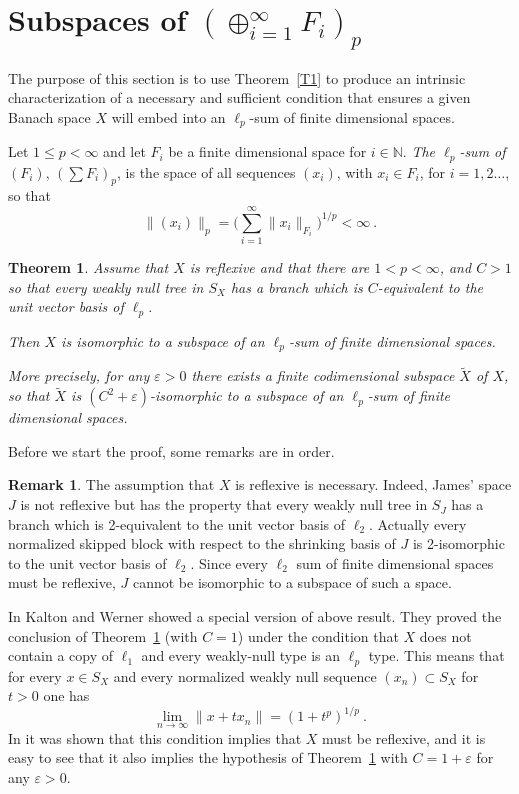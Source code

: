 \documentclass[11pt,leqno]{amsart}
\newtheorem{thm}{Theorem}[section]
\theoremstyle{definition}
\newtheorem*{remark}{Remark}
\newcommand{\vp}{\varepsilon}
\newcommand{\N}{\mathbb{N}}
\begin{document}
\section{Subspaces of $(\oplus_{i=1}^\infty F_i)_p$}\label{S3}

The purpose of this section is to use Theorem~\ref{T1} to produce an
intrinsic characterization of a necessary and sufficient 
condition that ensures a given Banach space
$X$ will embed into an $\ell_p$-sum of finite dimensional spaces.

Let $1\le p<\infty$ and let $F_i$  be a finite dimensional space for $i\in\N$.
{\em The $\ell_p$-sum of} $(F_i)$, $(\sum F_i)_p$, 
is the space  of all sequences
$(x_i)$, with $x_i\in F_i$, for $i=1,2\ldots$, so that
$$\|(x_i)\|_p=\biggl(\sum_{i=1}^\infty \|x_i\|_{F_i}\biggr)^{1/p}<\infty\ .$$

\begin{thm}\label{T2}  
Assume that $X$ is reflexive and that there are $1<p<\infty$,
and $C>1$ so that every weakly null tree in $S_X$ has a branch which
is $C$-equivalent to the  unit vector basis of $\ell_p$.

Then $X$ is isomorphic to a subspace of an $\ell_p$-sum of 
finite dimensional spaces.

More precisely, for any $\vp>0$ there exists a finite codimensional  subspace
$\tilde X$ of $X$, so that $\tilde X$ is $(C^2+\vp)$-isomorphic to
a subspace of an $\ell_p$-sum of finite dimensional spaces.
\end{thm}

Before we start the proof, some remarks are in order.

\begin{remark} 
The assumption that $X$ is reflexive is necessary. 
Indeed, James' space  $J$ \cite{Ja1} is not reflexive but  has 
the property that every weakly null
tree in $S_J$ has a branch which is 2-equivalent to the
unit vector basis of $\ell_2$. 
Actually every normalized skipped block with respect
to the shrinking basis of $J$ is 2-isomorphic to the unit vector basis
of $\ell_2$. 
Since every $\ell_2$ sum  of finite dimensional spaces
must be reflexive, $J$ cannot be isomorphic to a subspace of such a space.
\end{remark}
 
In \cite{KW} Kalton and Werner showed a special version of above result. 
They proved  the conclusion of Theorem~\ref{T2} (with $C=1$) 
under the condition that  $X$ does not contain a copy of $\ell_1$ and
every weakly-null type is an $\ell_p$ type.
This means that for every $x\in S_X$ and
every normalized weakly null sequence $(x_n)\subset S_X$ for $t>0$ one has  
\begin{equation}\label{E24}
\lim_{n\to\infty}\|x+tx_n\|=(1+t^p)^{1/p}\ .
\end{equation}
In \cite{KW} it was  shown  that this condition implies
that $X$ must be reflexive, and it is easy to see that it also implies
the hypothesis of Theorem~\ref{T2} with $C=1+\vp$ for any $\vp>0$.
\end{document}
